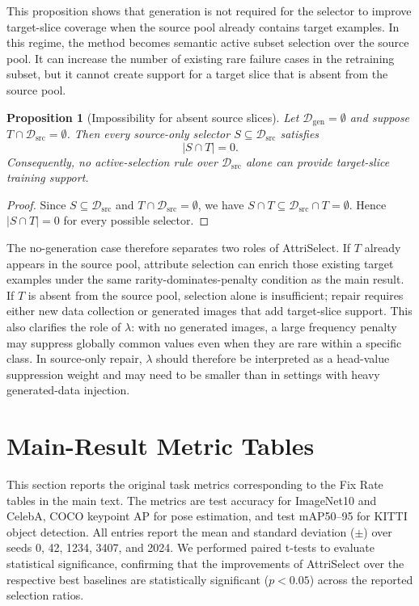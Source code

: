 \documentclass{article}
\newcommand{\model}{AttriSelect\xspace}
\newcommand{\dataset}{\mathcal{D}}
\newtheorem{proposition}{Proposition}
\begin{document}
This proposition shows that generation is not required for the selector to improve target-slice coverage when the source pool already contains target examples. In this regime, the method becomes semantic active subset selection over the source pool. It can increase the number of existing rare failure cases in the retraining subset, but it cannot create support for a target slice that is absent from the source pool.

\begin{proposition}[Impossibility for absent source slices]
Let $\dataset_{\mathrm{gen}}=\emptyset$ and suppose $T\cap\dataset_{\mathrm{src}}=\emptyset$. Then every source-only selector $S\subseteq\dataset_{\mathrm{src}}$ satisfies
\begin{equation}
|S\cap T|=0.
\end{equation}
Consequently, no active-selection rule over $\dataset_{\mathrm{src}}$ alone can provide target-slice training support.
\end{proposition}

\begin{proof}
Since $S\subseteq\dataset_{\mathrm{src}}$ and $T\cap\dataset_{\mathrm{src}}=\emptyset$, we have $S\cap T\subseteq\dataset_{\mathrm{src}}\cap T=\emptyset$. Hence $|S\cap T|=0$ for every possible selector.
\end{proof}

The no-generation case therefore separates two roles of \model. If $T$ already appears in the source pool, attribute selection can enrich those existing target examples under the same rarity-dominates-penalty condition as the main result. If $T$ is absent from the source pool, selection alone is insufficient; repair requires either new data collection or generated images that add target-slice support. This also clarifies the role of $\lambda$: with no generated images, a large frequency penalty may suppress globally common values even when they are rare within a specific class. In source-only repair, $\lambda$ should therefore be interpreted as a head-value suppression weight and may need to be smaller than in settings with heavy generated-data injection.

\section{Main-Result Metric Tables}
\label{app:main-metric-tables}

This section reports the original task metrics corresponding to the Fix Rate tables in the main text. The metrics are test accuracy for ImageNet10 and CelebA, COCO keypoint AP for pose estimation, and test mAP50--95 for KITTI object detection. All entries report the mean and standard deviation ($\pm$) over seeds 0, 42, 1234, 3407, and 2024. We performed paired t-tests to evaluate statistical significance, confirming that the improvements of \model over the respective best baselines are statistically significant ($p < 0.05$) across the reported selection ratios.
\end{document}
